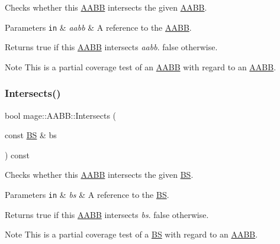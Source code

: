Checks whether this \hyperlink{structmage_1_1_a_a_b_b}{A\+A\+BB} intersects the given \hyperlink{structmage_1_1_a_a_b_b}{A\+A\+BB}.


\begin{DoxyParams}[1]{Parameters}
\mbox{\tt in}  & {\em aabb} & A reference to the \hyperlink{structmage_1_1_a_a_b_b}{A\+A\+BB}. \\
\hline
\end{DoxyParams}
\begin{DoxyReturn}{Returns}
{\ttfamily true} if this \hyperlink{structmage_1_1_a_a_b_b}{A\+A\+BB} intersects {\itshape aabb}. {\ttfamily false} otherwise. 
\end{DoxyReturn}
\begin{DoxyNote}{Note}
This is a partial coverage test of an \hyperlink{structmage_1_1_a_a_b_b}{A\+A\+BB} with regard to an \hyperlink{structmage_1_1_a_a_b_b}{A\+A\+BB}. 
\end{DoxyNote}
\hypertarget{structmage_1_1_a_a_b_b_ac51fa4b4d3100d587c6a2d2b5513ad88}{}\label{structmage_1_1_a_a_b_b_ac51fa4b4d3100d587c6a2d2b5513ad88} 
\subsubsection{\texorpdfstring{Intersects()}{Intersects()}\hspace{0.1cm}{\footnotesize\ttfamily [4/4]}}
{\footnotesize\ttfamily bool mage\+::\+A\+A\+B\+B\+::\+Intersects (\begin{DoxyParamCaption}\item[{const \hyperlink{structmage_1_1_b_s}{BS} \&}]{bs }\end{DoxyParamCaption}) const\hspace{0.3cm}{\ttfamily [noexcept]}}

Checks whether this \hyperlink{structmage_1_1_a_a_b_b}{A\+A\+BB} intersects the given \hyperlink{structmage_1_1_b_s}{BS}.


\begin{DoxyParams}[1]{Parameters}
\mbox{\tt in}  & {\em bs} & A reference to the \hyperlink{structmage_1_1_b_s}{BS}. \\
\hline
\end{DoxyParams}
\begin{DoxyReturn}{Returns}
{\ttfamily true} if this \hyperlink{structmage_1_1_a_a_b_b}{A\+A\+BB} intersects {\itshape bs}. {\ttfamily false} otherwise. 
\end{DoxyReturn}
\begin{DoxyNote}{Note}
This is a partial coverage test of a \hyperlink{structmage_1_1_b_s}{BS} with regard to an \hyperlink{structmage_1_1_a_a_b_b}{A\+A\+BB}. 
\end{DoxyNote}
\hypertarget{structmage_1_1_a_a_b_b_a5366c42bc506842e4c58a941c4a08f43}{}\label{structmage_1_1_a_a_b_b_a5366c42bc506842e4c58a941c4a08f43} 
